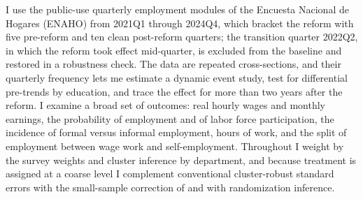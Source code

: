 I use the public-use quarterly employment modules of the Encuesta Nacional de Hogares (ENAHO) from 2021Q1 through 2024Q4, which bracket the reform with five pre-reform and ten clean post-reform quarters; the transition quarter 2022Q2, in which the reform took effect mid-quarter, is excluded from the baseline and restored in a robustness check. The data are repeated cross-sections, and their quarterly frequency lets me estimate a dynamic event study, test for differential pre-trends by education, and trace the effect for more than two years after the reform. I examine a broad set of outcomes: real hourly wages and monthly earnings, the probability of employment and of labor force participation, the incidence of formal versus informal employment, hours of work, and the split of employment between wage work and self-employment. Throughout I weight by the survey weights and cluster inference by department, and because treatment is assigned at a coarse level I complement conventional cluster-robust standard errors with the small-sample correction of \citet{pustejovsky_tipton_2018} and with randomization inference.

